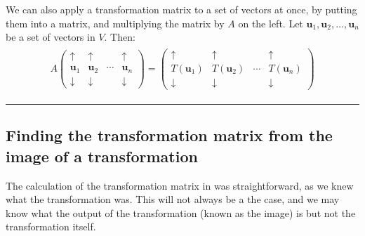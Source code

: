 \documentclass[letterpaper,10pt,english]{jupyterBook}
\begin{document}
\sphinxAtStartPar
We can also apply a transformation matrix to a set of vectors at once, by putting them into a matrix, and multiplying the matrix by \(A\) on the left. Let \(\mathbf{u}_1, \mathbf{u}_2, \ldots, \mathbf{u}_n\) be a set of vectors in \(V\). Then:
\begin{equation*}
\begin{split} \begin{align*}
    A
    \begin{pmatrix}
        \uparrow & \uparrow & & \uparrow \\
        \mathbf{u}_1 & \mathbf{u}_2 & \cdots & \mathbf{u}_n \\
        \downarrow & \downarrow & & \downarrow
    \end{pmatrix} =
    \begin{pmatrix}
        \uparrow & \uparrow & & \uparrow \\
        T(\mathbf{u}_1) & T(\mathbf{u}_2) & \cdots & T(\mathbf{u}_n) \\
        \downarrow & \downarrow & & \downarrow
    \end{pmatrix}
\end{align*} \end{split}
\end{equation*}

\bigskip\hrule\bigskip



\subsection{Finding the transformation matrix from the image of a transformation}
\label{\detokenize{_pages/6.1_Transformation_matrices:finding-the-transformation-matrix-from-the-image-of-a-transformation}}
\sphinxAtStartPar
The calculation of the transformation matrix in {\hyperref[\detokenize{_pages/6.1_Transformation_matrices:transformation-matrix-example}]{}} was straightforward, as we knew what the transformation was. This will not always be a the case, and we may know what the output of the transformation (known as the image) is \sphinxhyphen{} but not the transformation itself.
\end{document}
